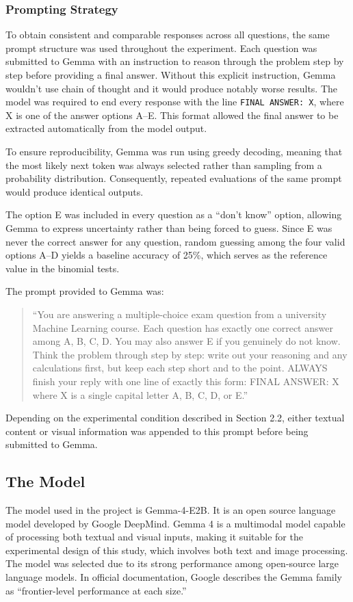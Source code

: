 \documentclass{article}
\begin{document}
\subsubsection{Prompting Strategy}

To obtain consistent and comparable responses across all questions, the same prompt structure was used throughout the experiment. Each question was submitted to Gemma with an instruction to reason through the problem step by step before providing a final answer. Without this explicit instruction, Gemma wouldn't use chain of thought and it would produce notably worse results. The model was required to end every response with the line \texttt{FINAL ANSWER: X}, where X is one of the answer options A--E. This format allowed the final answer to be extracted automatically from the model output.

To ensure reproducibility, Gemma was run using greedy decoding, meaning that the most likely next token was always selected rather than sampling from a probability distribution. Consequently, repeated evaluations of the same prompt would produce identical outputs.

The option E was included in every question as a ``don't know'' option, allowing Gemma to express uncertainty rather than being forced to guess. Since E was never the correct answer for any question, random guessing among the four valid options A--D yields a baseline accuracy of 25\%, which serves as the reference value in the binomial tests.

The prompt provided to Gemma was:

\begin{quote}
``You are answering a multiple-choice exam question from a university Machine Learning course. Each question has exactly one correct answer among A, B, C, D. You may also answer E if you genuinely do not know. Think the problem through step by step: write out your reasoning and any calculations first, but keep each step short and to the point. ALWAYS finish your reply with one line of exactly this form: FINAL ANSWER: X where X is a single capital letter A, B, C, D, or E.''
\end{quote}

Depending on the experimental condition described in Section 2.2, either textual content or visual information was appended to this prompt before being submitted to Gemma.

\subsection{The Model}
The model used in the project is Gemma-4-E2B. It is an open source language model developed by Google DeepMind. Gemma 4 is a multimodal model capable of processing both textual and visual inputs, making it suitable for the experimental design of this study, which involves both text and image processing. The model was selected due to its strong performance among open-source large language models. In official documentation, Google describes the Gemma family as “frontier-level performance at each size.”\supercite{gemma4modelcard}
\end{document}
